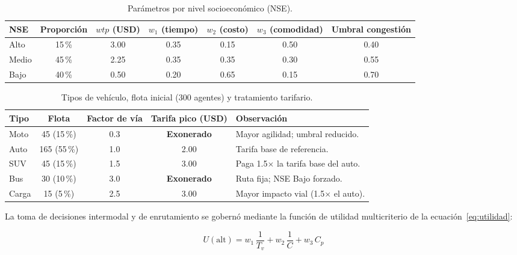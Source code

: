 \documentclass[twocolumn,10pt]{article}
\begin{document}
\begin{table}[!t]
  \centering
  \caption{Par\'ametros por nivel socioecon\'omico (NSE).}
  \label{tab:nse}
  \small
  \renewcommand{\arraystretch}{1.25}
  \begin{tabular}{@{}lcccccc@{}}
    \toprule
    \textbf{NSE} & \textbf{Proporci\'on} & \textbf{$wtp$ (USD)} & \textbf{$w_1$ (tiempo)} &
    \textbf{$w_2$ (costo)} & \textbf{$w_3$ (comodidad)} & \textbf{Umbral congesti\'on}\\
    \midrule
    Alto  & 15\,\% & 3.00 & 0.35 & 0.15 & 0.50 & 0.40\\
    Medio & 45\,\% & 2.25 & 0.35 & 0.35 & 0.30 & 0.55\\
    Bajo  & 40\,\% & 0.50 & 0.20 & 0.65 & 0.15 & 0.70\\
    \bottomrule
  \end{tabular}
\end{table}

\begin{table}[!t]
  \centering
  \caption{Tipos de veh\'iculo, flota inicial (300 agentes) y tratamiento tarifario.}
  \label{tab:vehiculos}
  \small
  \renewcommand{\arraystretch}{1.3}
  \begin{tabularx}{\textwidth}{@{}lcccX@{}}
    \toprule
    \textbf{Tipo} & \textbf{Flota} & \textbf{Factor de v\'ia} &
    \textbf{Tarifa pico (USD)} & \textbf{Observaci\'on}\\
    \midrule
    Moto  & 45 (15\,\%)  & 0.3 & \textbf{Exonerado} & Mayor agilidad; umbral reducido.\\
    Auto  & 165 (55\,\%) & 1.0 & 2.00 & Tarifa base de referencia.\\
    SUV   & 45 (15\,\%)  & 1.5 & 3.00 & Paga 1.5$\times$ la tarifa base del auto.\\
    Bus   & 30 (10\,\%)  & 3.0 & \textbf{Exonerado} & Ruta fija; NSE Bajo forzado.\\
    Carga & 15 (5\,\%)   & 2.5 & 3.00 & Mayor impacto vial (1.5$\times$ el auto).\\
    \bottomrule
  \end{tabularx}
\end{table}

La toma de decisiones intermodal y de enrutamiento se gobern\'o mediante la funci\'on de
utilidad multicriterio de la ecuaci\'on~\eqref{eq:utilidad}:

\begin{equation}
U(\text{alt}) = w_1\,\frac{1}{T_v} + w_2\,\frac{1}{C} + w_3\,C_p
\label{eq:utilidad}
\end{equation}
\end{document}
